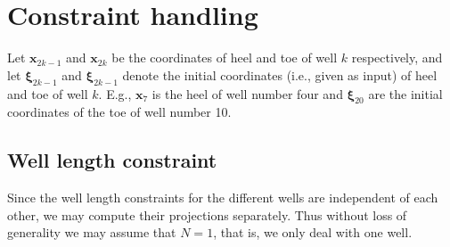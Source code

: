 
\chapter{Constraint handling}
%
Let $\textbf{x}_{2k-1}$ and $\textbf{x}_{2k}$ be the coordinates of heel and 
toe of well $k$ respectively, and let $\boldsymbol{\xi}_{2k-1}$ and $\boldsymbol{\xi}_{2k-1}$
denote the initial coordinates (i.e., given as input) of heel and toe of well $k$. E.g., $\textbf{x}_{7}$
is the heel of well number four and $\boldsymbol{\xi}_{20}$ are the initial coordinates
of the toe of well number 10.\\
%
%
\section{Well length constraint}
%
Since the well length constraints for the different wells are
independent of each other, we may compute their projections separately. 
Thus without loss of generality we may assume that $N=1$, that
is, we only deal with one well.

